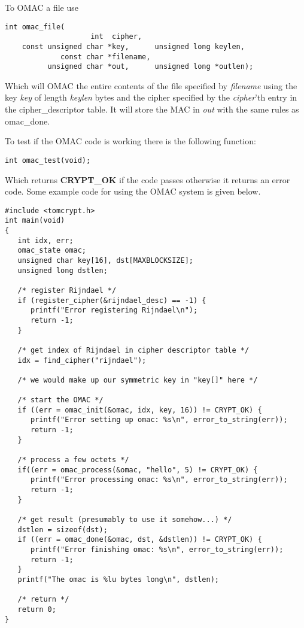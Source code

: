 \documentclass[synpaper]{book}
\begin{document}
To OMAC a file use
\begin{verbatim}
int omac_file(
                    int  cipher,
    const unsigned char *key,      unsigned long keylen,
             const char *filename,
          unsigned char *out,      unsigned long *outlen);
\end{verbatim}

Which will OMAC the entire contents of the file specified by \textit{filename} using the key \textit{key} of length \textit{keylen} bytes
and the cipher specified by the \textit{cipher}'th entry in the cipher\_descriptor table.  It will store the MAC in \textit{out} with
the same rules as omac\_done.

To test if the OMAC code is working there is the following function:
\begin{verbatim}
int omac_test(void);
\end{verbatim}
Which returns {\bf CRYPT\_OK} if the code passes otherwise it returns an error code.  Some example code for using the
OMAC system is given below.

\begin{small}
\begin{verbatim}
#include <tomcrypt.h>
int main(void)
{
   int idx, err;
   omac_state omac;
   unsigned char key[16], dst[MAXBLOCKSIZE];
   unsigned long dstlen;

   /* register Rijndael */
   if (register_cipher(&rijndael_desc) == -1) {
      printf("Error registering Rijndael\n");
      return -1;
   }

   /* get index of Rijndael in cipher descriptor table */
   idx = find_cipher("rijndael");

   /* we would make up our symmetric key in "key[]" here */

   /* start the OMAC */
   if ((err = omac_init(&omac, idx, key, 16)) != CRYPT_OK) {
      printf("Error setting up omac: %s\n", error_to_string(err));
      return -1;
   }

   /* process a few octets */
   if((err = omac_process(&omac, "hello", 5) != CRYPT_OK) {
      printf("Error processing omac: %s\n", error_to_string(err));
      return -1;
   }

   /* get result (presumably to use it somehow...) */
   dstlen = sizeof(dst);
   if ((err = omac_done(&omac, dst, &dstlen)) != CRYPT_OK) {
      printf("Error finishing omac: %s\n", error_to_string(err));
      return -1;
   }
   printf("The omac is %lu bytes long\n", dstlen);

   /* return */
   return 0;
}
\end{verbatim}
\end{small}
\end{document}
